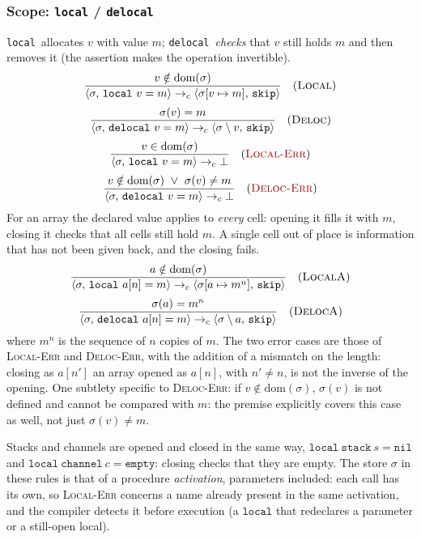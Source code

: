 \subsubsection{Scope: \texttt{local} / \texttt{delocal}}
\label{sec:scope}
\texttt{local}\ allocates $v$ with value $m$; \texttt{delocal}\ \emph{checks} that
$v$ still holds $m$ and then removes it (the assertion makes the operation
invertible).
\[
\dfrac{v \notin \mathrm{dom}(\sigma)}
      {\cfg{\mathtt{local}\ v = m}{\sigma} \toc \cfg{\mathtt{skip}}{\upd{\sigma}{v}{m}}} \rname{Local}
\]
\[
\dfrac{\sigma(v) = m}
      {\cfg{\mathtt{delocal}\ v = m}{\sigma} \toc \cfg{\mathtt{skip}}{\sigma \setminus v}} \rname{Deloc}
\]
\[
\dfrac{v \in \mathrm{dom}(\sigma)}
      {\cfg{\mathtt{local}\ v = m}{\sigma} \toc \err} \rnameerr{Local-Err}
\]
\[
\dfrac{v \notin \mathrm{dom}(\sigma) \ \lor\ \sigma(v) \neq m}
      {\cfg{\mathtt{delocal}\ v = m}{\sigma} \toc \err} \rnameerr{Deloc-Err}
\]
For an array the declared value applies to \emph{every} cell: opening it
fills it with $m$, closing it checks that all cells still hold $m$. A single cell
out of place is information that has not been given back, and the closing fails.
\[
\dfrac{a \notin \mathrm{dom}(\sigma)}
      {\cfg{\mathtt{local}\ a[n] = m}{\sigma} \toc \cfg{\mathtt{skip}}{\upd{\sigma}{a}{m^{n}}}} \rname{LocalA}
\]
\[
\dfrac{\sigma(a) = m^{n}}
      {\cfg{\mathtt{delocal}\ a[n] = m}{\sigma} \toc \cfg{\mathtt{skip}}{\sigma \setminus a}} \rname{DelocA}
\]
where $m^{n}$ is the sequence of $n$ copies of $m$. The two error cases are those
of \textsc{Local-Err} and \textsc{Deloc-Err}, with the addition of a mismatch on the
length: closing as $a[n']$ an array opened as $a[n]$, with $n' \neq n$,
is not the inverse of the opening.
One
subtlety specific to \textcolor{red!60!black}{\textsc{Deloc-Err}}: if $v \notin \mathrm{dom}(\sigma)$,
$\sigma(v)$ is not defined and cannot be compared with $m$: the premise
explicitly covers this case as well, not just $\sigma(v) \neq m$.

Stacks and channels are opened and closed in the same way,
$\mathtt{local}\ \mathtt{stack}\ s = \mathtt{nil}$ and
$\mathtt{local}\ \mathtt{channel}\ c = \mathtt{empty}$: closing checks
that they are empty. The store $\sigma$ in these rules is that of
a procedure \emph{activation}, parameters included: each call has its
own, so \textsc{Local-Err} concerns a name already present in the same
activation, and the compiler detects it before execution (a
$\mathtt{local}$ that redeclares a parameter or a still-open local).

